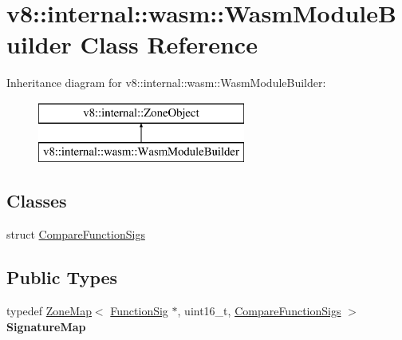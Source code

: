 \hypertarget{classv8_1_1internal_1_1wasm_1_1_wasm_module_builder}{}\section{v8\+:\+:internal\+:\+:wasm\+:\+:Wasm\+Module\+Builder Class Reference}
\label{classv8_1_1internal_1_1wasm_1_1_wasm_module_builder}
Inheritance diagram for v8\+:\+:internal\+:\+:wasm\+:\+:Wasm\+Module\+Builder\+:\begin{figure}[H]
\begin{center}
\leavevmode
\includegraphics[height=2.000000cm]{classv8_1_1internal_1_1wasm_1_1_wasm_module_builder}
\end{center}
\end{figure}
\subsection*{Classes}
\begin{DoxyCompactItemize}
\item 
struct \hyperlink{structv8_1_1internal_1_1wasm_1_1_wasm_module_builder_1_1_compare_function_sigs}{Compare\+Function\+Sigs}
\end{DoxyCompactItemize}
\subsection*{Public Types}
\begin{DoxyCompactItemize}
\item 
typedef \hyperlink{classv8_1_1internal_1_1_zone_map}{Zone\+Map}$<$ \hyperlink{classv8_1_1internal_1_1_signature}{Function\+Sig} $\ast$, uint16\+\_\+t, \hyperlink{structv8_1_1internal_1_1wasm_1_1_wasm_module_builder_1_1_compare_function_sigs}{Compare\+Function\+Sigs} $>$ {\bfseries Signature\+Map}\hypertarget{classv8_1_1internal_1_1wasm_1_1_wasm_module_builder_a0dfb593c96255c597f5663c8a2d51fd3}{}\label{classv8_1_1internal_1_1wasm_1_1_wasm_module_builder_a0dfb593c96255c597f5663c8a2d51fd3}

\end{DoxyCompactItemize}

